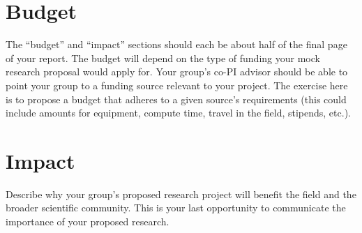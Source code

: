 \documentclass[11pt,letterpaper]{article}
\begin{document}
\section{Budget}
The ``budget'' and ``impact'' sections should each be about half of the final page of your report. The budget will depend on the type of funding your mock research proposal would apply for. Your group's co-PI advisor should be able to point your group to a funding source relevant to your project. The exercise here is to propose a budget that adheres to a given source's requirements (this could include amounts for equipment, compute time, travel in the field, stipends, etc.).


\section{Impact}
Describe why your group's proposed research project will benefit the field and the broader scientific community. This is your last opportunity to communicate the importance of your proposed research.






\newpage
\end{document}
